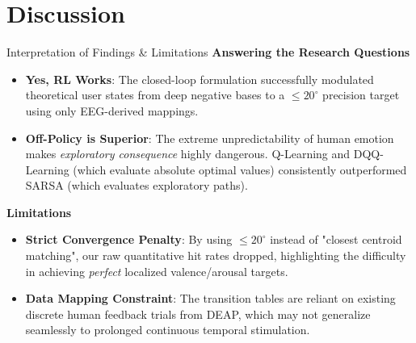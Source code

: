 \documentclass[10pt, aspectratio=169]{beamer}
\begin{document}
\section{Discussion}
\begin{frame}{Interpretation of Findings \& Limitations}
    \textbf{Answering the Research Questions}
    \begin{itemize}
        \item \textbf{Yes, RL Works}: The closed-loop formulation successfully modulated theoretical user states from deep negative bases to a $\leq 20^\circ$ precision target using only EEG-derived mappings.
        \item \textbf{Off-Policy is Superior}: The extreme unpredictability of human emotion makes \textit{exploratory consequence} highly dangerous. Q-Learning and DQQ-Learning (which evaluate absolute optimal values) consistently outperformed SARSA (which evaluates exploratory paths).
    \end{itemize}
    
    \vspace{0.4cm}
    \textbf{Limitations}
    \begin{itemize}
        \item \textbf{Strict Convergence Penalty}: By using $\leq 20^\circ$ instead of "closest centroid matching", our raw quantitative hit rates dropped, highlighting the difficulty in achieving \textit{perfect} localized valence/arousal targets.
        \item \textbf{Data Mapping Constraint}: The transition tables are reliant on existing discrete human feedback trials from DEAP, which may not generalize seamlessly to prolonged continuous temporal stimulation.
    \end{itemize}
\end{frame}
\end{document}
